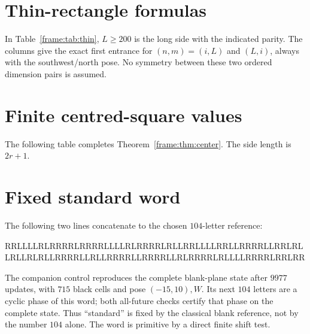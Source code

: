 \section{Thin-rectangle formulas}\label{frame:sec:thin}
In Table~\ref{frame:tab:thin}, $L\ge200$ is the long side with the indicated parity. The columns give the exact first entrance for $(n,m)=(i,L)$ and $(L,i)$, always with the southwest/north pose. No symmetry between these two ordered dimension pairs is assumed.


\FloatBarrier
\section{Finite centred-square values}\label{frame:sec:center}
The following table completes Theorem~\ref{frame:thm:center}. The side length is $2r+1$.


\section{Fixed standard word}\label{frame:sec:word}
The following two lines concatenate to the chosen $104$-letter reference:
\begin{center}\small\ttfamily
RRLLLLRLRRRRLRRRRLLLLRLRRRRLRLLRRLLLLRRLLRRRRLLRRLRL\\
LRLLRLRLLRRRRLLRLLRRRRLLRRRRLLRLRRRRLRLLLLRRRRLRRLRR
\end{center}
The companion control reproduces the complete blank-plane state after $9977$ updates, with $715$ black cells and pose $(-15,10),W$. Its next $104$ letters are a cyclic phase of this word; both all-future checks certify that phase on the complete state. Thus ``standard'' is fixed by the classical blank reference, not by the number $104$ alone. The word is primitive by a direct finite shift test.

